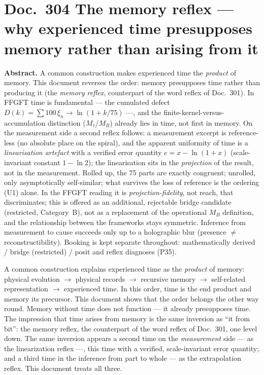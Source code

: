 
\section*{Doc.~304 \quad The memory reflex --- why experienced time presupposes memory
rather than arising from it}

\begingroup\small\noindent
\textbf{Abstract.} A common construction makes experienced time the \emph{product} of memory.
This document reverses the order: memory presupposes time rather than producing it (the
\emph{memory reflex}, counterpart of the word reflex of Doc.~301). In FFGFT time is
fundamental --- the cumulated defect $D(k)=\sum 100\,\xi_n\to\ln(1+k/75)$ ---, and the
finite-kernel-versus-accumulation distinction ($M_\tau$/$M_B$) already lies in time, not
first in memory. On the measurement side a second reflex follows: a measurement excerpt is
reference-less (no absolute place on the spiral), and the apparent uniformity of time is a
\emph{linearisation artefact} with a verified error quantity $e=x-\ln(1+x)$ (scale-invariant
constant $1-\ln 2$); the linearisation sits in the \emph{projection} of the result, not in
the measurement. Rolled up, the 75 parts are exactly congruent; unrolled, only asymptotically
self-similar; what survives the loss of reference is the ordering (U1) alone. In the FFGFT reading it is
\emph{projection-fidelity}, not reach, that discriminates; this is offered as an additional,
rejectable bridge candidate (restricted, Category~B), not as a replacement of the operational $M_B$ definition, and the
relationship between the frameworks stays symmetric. Inference from measurement to cause
succeeds only up to a holographic blur (presence $\neq$ reconstructibility). Booking is kept
separate throughout: mathematically derived / bridge (restricted) / posit and reflex
diagnoses (P35).
\par\endgroup

\medskip

A common construction explains experienced time as the \emph{product} of memory: physical
evolution $\to$ physical records $\to$ recursive memory $\to$ self-related representation
$\to$ experienced time. In this order, time is the end product and memory its precursor.
This document shows that the order belongs the other way round. Memory without time does
not function --- it already presupposes time. The impression that time arises from memory is
the same inversion as \enquote{it from bit}: the memory reflex, the counterpart of the
word reflex of Doc.~301, one level down. The same inversion appears a second time on the
\emph{measurement} side --- as the linearization reflex ---, this time with a verified,
scale-invariant error quantity; and a third time in the inference from part to whole --- as
the extrapolation reflex. This document treats all three.

